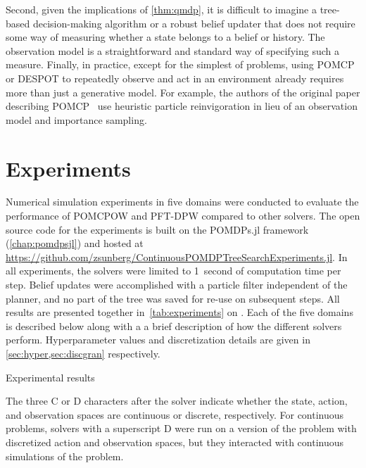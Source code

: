 Second, given the implications of \cref{thm:qmdp}, it is difficult to imagine a tree-based decision-making algorithm or a robust belief updater that does not require some way of measuring whether a state belongs to a belief or history.
The observation model is a straightforward and standard way of specifying such a measure.
Finally, in practice, except for the simplest of problems, using POMCP or DESPOT to repeatedly observe and act in an environment already requires more than just a generative model.
For example, the authors of the original paper describing POMCP~\cite{silver2010pomcp} use heuristic particle reinvigoration in lieu of an observation model and importance sampling.

\section{Experiments} \label{sec:experiments}

Numerical simulation experiments in five domains were conducted to evaluate the performance of POMCPOW and PFT-DPW compared to other solvers.
The open source code for the experiments is built on the POMDPs.jl framework (\cref{chap:pomdpsjl}) and hosted at \url{https://github.com/zsunberg/ContinuousPOMDPTreeSearchExperiments.jl}.
In all experiments, the solvers were limited to \SI{1}{second} of computation time per step.
Belief updates were accomplished with a particle filter independent of the planner, and no part of the tree was saved for re-use on subsequent steps.
All results are presented together in~\cref{tab:experiments} on .
Each of the five domains is described below along with a a brief description of how the different solvers perform.
Hyperparameter values and discretization details are given in \cref{sec:hyper,sec:discgran} respectively.

\begin{table}
    {
        \caption{Experimental results} \label{tab:experiments}

        
    }
    \vspace{5mm}
    \footnotesize{The three C or D characters after the solver indicate whether the state, action, and observation spaces are continuous or discrete, respectively. For continuous problems, solvers with a superscript D were run on a version of the problem with discretized action and observation spaces, but they interacted with continuous simulations of the problem.}
\end{table}



